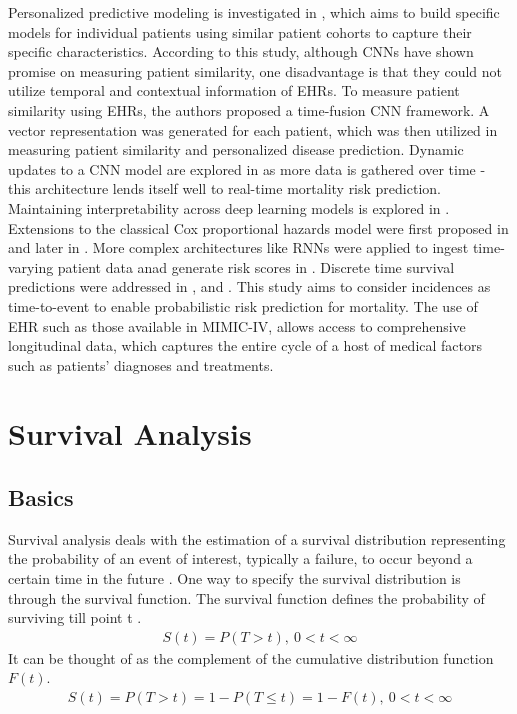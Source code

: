 \documentclass[%
 twocolumn,
 reprint,
 amsmath,amssymb,
 aps,nofootinbib
]{revtex4-2}
\begin{document}
Personalized predictive modeling is investigated in \cite{suo2017personalized}, which aims to build specific models for individual patients using similar patient cohorts to capture their specific characteristics. According to this study, although CNNs have shown promise on measuring patient similarity, one disadvantage is that they could not utilize temporal and contextual information of EHRs. To measure patient similarity using EHRs, the authors proposed a time-fusion CNN framework. A vector representation was generated for each patient, which was then utilized in measuring patient similarity and personalized disease prediction. Dynamic updates to a CNN model are explored in \cite{brand2018real} as more data is gathered over time - this architecture lends itself well to real-time mortality risk prediction. Maintaining interpretability across deep learning models is explored in \cite{caicedo2019iseeu}.\\

Extensions to the classical Cox proportional hazards model were first proposed in \cite{faraggi_simons} and later in \cite{deepsurv}. More complex architectures like RNNs were applied to ingest time-varying patient data anad generate risk scores in \cite{rnn_surv}. Discrete time survival predictions were addressed in \cite{kvamme_tte}, \cite{nagpal_deep_2021} and \cite{deephit}. This study aims to consider incidences as time-to-event to enable  probabilistic risk prediction for mortality. The use of EHR such as those available in MIMIC-IV, allows access to comprehensive longitudinal data, which captures the entire cycle of a host of medical factors such as patients' diagnoses and treatments.

\section{\label{surv}Survival Analysis}
\subsection{\label{surv_basics}Basics}
Survival analysis deals with the estimation of a survival distribution representing the probability of an event of interest, typically a failure, to occur beyond a certain time in the future \cite{nagpal_deep_2021}. One way to specify the survival distribution is through the survival function. The survival function defines the probability of surviving till point t \cite{Moore_2016}.
\begin{align}
S(t) = P(T>t), \ 0 < t <  \infty \label{eq:surv}
\end{align}
It can be thought of as the complement of the cumulative distribution function $F(t)$.
\begin{align}
S(t) = P(T>t) = 1 - P(T\le t) = 1 - F(t), \ 0 < t <  \infty \label{eq:inv_cum_dist}
\end{align}
\end{document}
